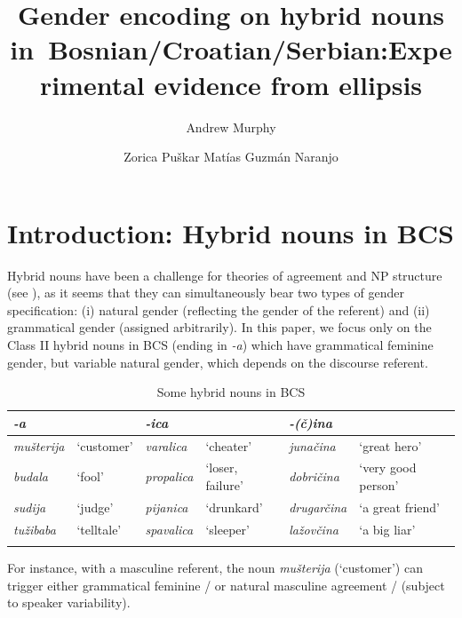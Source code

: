 \documentclass[output=paper,
modfonts,
newtxmath,
hidelinks
]{langscibook}
\title{Gender encoding on hybrid nouns in~Bosnian/Croatian/Serbian:\newlineCover Experimental evidence from ellipsis}
\author{%
 Andrew Murphy\affiliation{University of Leipzig}\and 
 Zorica Puškar\affiliation{Leibniz-Zentrum Allgemeine Sprachwissenschaft, Berlin}\lastand 
 Matías Guzmán Naranjo\affiliation{Heinrich Heine University Düsseldorf}
}
\begin{document}
\maketitle
{}

\section{Introduction: Hybrid nouns in BCS}

Hybrid nouns have been a challenge for theories of agreement and NP structure (see \citealt{corbett91,wandz03,aandalfg,aandalanguage,pesetsky14,kramerbook,landau15,smith15,smith16,arsenijevicjuksek,despichybrid17}), as it seems that they can simultaneously bear two types of gender specification: 
(i) natural gender (reflecting the gender of the referent) and
(ii) grammatical gender (assigned arbitrarily). In this paper, we focus only on the Class II hybrid nouns in BCS (ending in \textit{-a}) which have grammatical feminine gender, but variable natural gender, which depends on the discourse referent.
	

\begin{table}
\caption{Some hybrid nouns in BCS}\label{t1}
\small
\begin{tabularx}{\textwidth}{llllll}
\lsptoprule
\textbf{\textit{-a}}&&\textbf{\textit{-ica}}&&\textbf{\textit{-(č)ina}}&\\
\midrule
\textit{mušterija} & `customer' &  \textit{varalica} & `cheater'  & \textit{junačina} & `great hero'\\  
\textit{budala} & `fool'  & \textit{propalica} & `loser, failure' & \textit{dobričina} & `very good person'\\
\textit{sudija} & `judge' & \textit{pijanica} & `drunkard'  & \textit{drugarčina} & `a great friend'\\
\textit{tužibaba} & `telltale' & \textit{spavalica} & `sleeper' & \textit{lažovčina} & `a big liar' \\
\lspbottomrule
\end{tabularx}
\end{table}

\noindent For instance, with a masculine referent, the noun \textit{mušterija} (`customer') can trigger either grammatical feminine  / or natural masculine agreement  / (subject to speaker variability).
	
\end{document}
